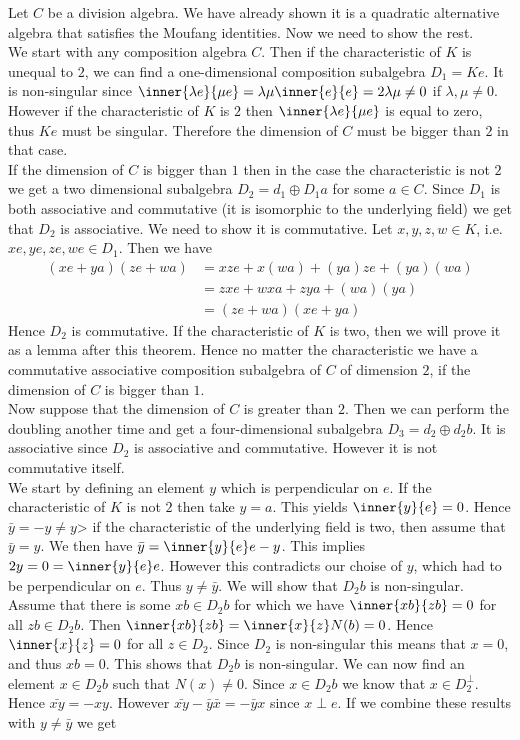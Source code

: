 \documentclass[../Thesis.tex]{subfiles}
\begin{document}
\begin{myproof}
Let $C$ be a division algebra. We have already shown it is a quadratic alternative algebra that satisfies the Moufang identities. Now we need to show the rest.
\\We start with any composition algebra $C$. Then if the characteristic of $K$ is unequal to $2$, we can find a one-dimensional composition subalgebra $D_1 = Ke$. It is non-singular since $\inner{\lambda e}{\mu e} = \lambda \mu \inner{e}{e} = 2 \lambda \mu \neq 0$ if $\lambda, \mu \neq 0$. However if the characteristic of $K$ is $2$ then $\inner{\lambda e}{\mu e}$ is equal to zero, thus $Ke$ must be singular. Therefore the dimension of $C$ must be bigger than $2$ in that case.
\\If the dimension of $C$ is bigger than $1$ then in the case the characteristic is not $2$ we get a two dimensional subalgebra $D_2 = d_1 \oplus D_1 a$ for some $a \in C$. Since $D_1$ is both associative and commutative (it is isomorphic to the underlying field) we get that $D_2$ is associative. We need to show it is commutative. Let $x,y, z ,w \in K$, i.e. $xe, ye, ze, we \in D_1$. Then we have
\begin{align*}
(xe + ya)(ze + wa) &= xze + x(wa) + (ya)ze + (ya)(wa) \\
&= zxe + wxa +  zya + (wa)(ya)\\
&= (ze + wa)(xe + ya)
\end{align*}
Hence $D_2$ is commutative. If the characteristic of $K$ is two, then we will prove it as a lemma after this theorem. Hence no matter the characteristic we have a commutative associative composition subalgebra of $C$ of dimension $2$, if the dimension of $C$ is bigger than $1$.
\\Now suppose that the dimension of $C$ is greater than $2$. Then we can perform the doubling another time and get a four-dimensional subalgebra $D_3 = d_2 \oplus d_2 b$. It is associative since $D_2$ is associative and commutative. However it is not commutative itself.
\\We start by defining an element $y$ which is perpendicular on $e$. If the characteristic of $K$ is not $2$ then take $y = a$. This yields $\inner{y}{e} = 0$. Hence $\bar{y} = -y \neq y$> if the characteristic of the underlying field is two, then assume that $\bar{y} = y$. We then have $\bar{y} = \inner{y}{e}e - y$. This implies $2y = 0 = \inner{y}{e}e$. However this contradicts our choise of $y$, which had to be perpendicular on $e$.  Thus $y \neq \bar{y}$. We will show that $D_2b$ is non-singular. Assume that there is some $xb \in D_2b$ for which we have $\inner{xb}{zb} = 0$ for all $zb \in D_2b$. Then $\inner{xb}{zb} = \inner{x}{z}N(b) = 0$. Hence $\inner{x}{z} = 0$ for all $z \in D_2$. Since $D_2$ is non-singular this means that $x = 0$, and thus $xb =0$. This shows that $D_2b$ is non-singular. We can now find an element $ x \in D_2 b$ such that $N(x) \neq 0$. Since $ x \in D_2 b$ we know that $ x \in D_2^\perp$. Hence $\bar{xy} = -xy$. However $\bar{xy} - \bar{y}\bar{x} = -\bar{y} x$ since $ x \perp e$. If we combine these results with $y \neq \bar{y}$ we get

\end{myproof}
\end{document}
